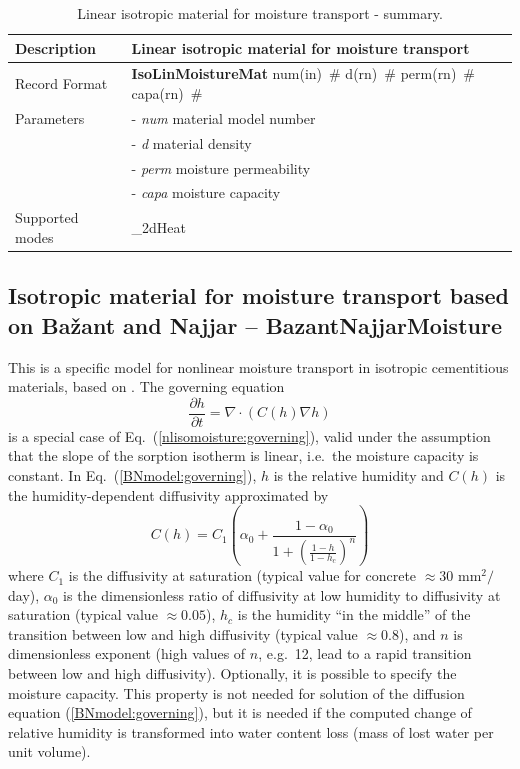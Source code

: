 \documentclass[a4paper]{article}
\newcommand{\descitem}[1]{{\noindent \bf #1}}
\newcommand{\elemparam}[2]{{{#1\tiny (#2)}~\#}}
\newcommand{\param}[1]{{\it #1}}
\newcommand{\refeq}[1]{Eq.~(\ref{#1})}
\begin{document}
\begin{table}[!htb]
\begin{tabular}{|l|p{9cm}|}
\hline
Description & Linear isotropic material for moisture transport\\
\hline
Record Format & \descitem{IsoLinMoistureMat} \elemparam{num}{in}
\elemparam{d}{rn} \elemparam{perm}{rn} \elemparam{capa}{rn}\\
Parameters &- \param{num} material model number\\
&- \param{d} material density\\
&- \param{perm} moisture permeability\\
&- \param{capa} moisture capacity\\
Supported modes& \_2dHeat\\
\hline
\end{tabular}
\caption{Linear isotropic material for moisture transport - summary.}
\label{IsoLinmoistureMat_table}
\end{table}

\subsection{Isotropic material for moisture transport based on Ba\v{z}ant
  and Najjar -- BazantNajjarMoisture}
\label{sec:BazantNajjarMoistureMat}
This is a specific model for nonlinear moisture transport in isotropic cementitious
materials, based on \cite{Bazant:72}.
The governing equation 
\begin{equation}\label{BNmodel:governing}
\frac{\partial h}{\partial t} = \nabla \cdot \left( C(h) \nabla h \right)
\end{equation} 
is a special case of \refeq{nlisomoisture:governing}, valid under
the assumption that the slope of the sorption isotherm is linear, i.e.\ the
moisture capacity is constant.
In \refeq{BNmodel:governing}, $h$ is the relative humidity and $C(h)$ is the
humidity-dependent diffusivity approximated by
\begin{equation}\label{BNmodel:diffusivity}
C (h) = C_1 \left( \alpha_0
+ \frac{1-\alpha_0}{1+\left(\frac{1-h}{1-h_c}\right)^n} \right)
\end{equation}
where $C_1$ is the diffusivity at saturation (typical value for concrete
$\approx 30$ mm$^2/$day), $\alpha_0$ is the dimensionless ratio of
diffusivity at low humidity to diffusivity at saturation (typical
value $\approx 0.05$), $h_c$ is the humidity ``in the middle'' of the
transition between low and high diffusivity (typical value $\approx 0.8$), and $n$ is dimensionless
exponent (high values of $n$, e.g.\ 12, lead to a rapid transition
between low and high diffusivity). Optionally, it is possible to
specify the moisture capacity. This property is not needed for solution
of the diffusion equation  (\ref{BNmodel:governing}),
but it is needed if the computed change of relative humidity is transformed     
into water content loss (mass of lost water per unit volume).
\end{document}

